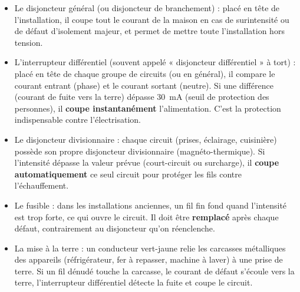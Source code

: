 \documentclass[11pt]{article}
\newcommand{\cle}[1]{{\popxbold\color{popdark}#1}}
\begin{document}
\begin{definition}
\begin{itemize}
\item Le \cle{disjoncteur général} (ou disjoncteur de branchement) : placé en tête de l'installation, il coupe tout le courant de la maison en cas de surintensité ou de défaut d'isolement majeur, et permet de mettre toute l'installation hors tension.
\item L'\cle{interrupteur différentiel} (souvent appelé « disjoncteur différentiel » à tort) : placé en tête de chaque groupe de circuits (ou en général), il compare le courant entrant (phase) et le courant sortant (neutre). Si une différence (courant de fuite vers la terre) dépasse \SI{30}{mA} (seuil de protection des personnes), il \textbf{coupe instantanément} l'alimentation. C'est la protection indispensable contre l'électrisation.
\item Le \cle{disjoncteur divisionnaire} : chaque circuit (prises, éclairage, cuisinière) possède son propre disjoncteur divisionnaire (magnéto-thermique). Si l'intensité dépasse la valeur prévue (court-circuit ou surcharge), il \textbf{coupe automatiquement} ce seul circuit pour protéger les fils contre l'échauffement.
\item Le \cle{fusible} : dans les installations anciennes, un fil fin fond quand l'intensité est trop forte, ce qui ouvre le circuit. Il doit être \textbf{remplacé} après chaque défaut, contrairement au disjoncteur qu'on réenclenche.
\item La \cle{mise à la terre} : un conducteur vert-jaune relie les carcasses métalliques des appareils (réfrigérateur, fer à repasser, machine à laver) à une prise de terre. Si un fil dénudé touche la carcasse, le courant de défaut s'écoule vers la terre, l'interrupteur différentiel détecte la fuite et coupe le circuit.
\end{itemize}
\end{definition}
\end{document}
